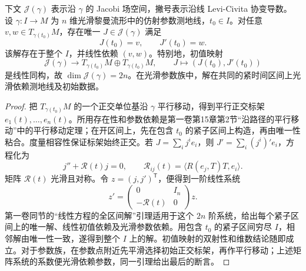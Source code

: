 \begin{theorem}\label{g3:thm:jacobi-initial-data}
	下文 \(\mathcal J(\gamma)\) 表示沿 \(\gamma\) 的 Jacobi 场空间，撇号表示沿线 Levi-Civita 协变导数。
	设 \(\gamma:I\to M\) 为 \(n\) 维光滑黎曼流形中的仿射参数测地线，\(t_0\in I\)。对任意 \(v,w\in T_{\gamma(t_0)}M\)，存在唯一 \(J\in\mathcal J(\gamma)\) 满足
	\[
		J(t_0)=v,\qquad J'(t_0)=w.
	\]
	该解存在于整个 \(I\)，并线性依赖 \((v,w)\)。特别地，初值映射
	\begin{equation}\label{g3:eq:jacobi-initial-isomorphism}
		\mathcal J(\gamma)\longrightarrow
		T_{\gamma(t_0)}M\oplus T_{\gamma(t_0)}M,
		\qquad J\longmapsto(J(t_0),J'(t_0))
	\end{equation}
	是线性同构，故 \(\dim\mathcal J(\gamma)=2n\)。在光滑参数族中，解在共同的紧时间区间上光滑依赖测地线及初始数据。
\end{theorem}
\begin{proof}
	把 \(T_{\gamma(t_0)}M\) 的一个正交单位基沿 \(\gamma\) 平行移动，得到平行正交标架 \(e_1(t),\ldots,e_n(t)\)。所用存在性和参数依赖是第一卷第15章第2节“沿路径的平行移动”中的平行移动定理；在开区间上，先在包含 \(t_0\) 的紧子区间上构造，再由唯一性粘合。度量相容性保证标架始终正交。若 \(J=\sum_i j^ie_i\)，则 \(J'=\sum_i(j^i)'e_i\)，方程化为
	\begin{equation}\label{g3:eq:jacobi-matrix-equation}
		j''+\mathcal R(t)j=0,
		\qquad \mathcal R_{ij}(t)=\langle R(e_j,T)T,e_i\rangle.
	\end{equation}
	矩阵 \(\mathcal R(t)\) 光滑且对称。令 \(z=(j,j')^{\mathsf T}\)，便得到一阶线性系统
	\[
		z'=\begin{pmatrix}0&I_n\\-\mathcal R(t)&0\end{pmatrix}z.
	\]
	第一卷同节的“线性方程的全区间解”引理适用于这个 \(2n\) 阶系统，给出每个紧子区间上的唯一解、线性初值依赖及光滑参数依赖。用包含 \(t_0\) 的紧子区间穷尽 \(I\)，相邻解由唯一性一致，遂得到整个 \(I\) 上的解。初值映射的双射性和维数结论随即成立。对于参数族，在参数点附近先平滑选择初始正交标架，再作平行移动；上述矩阵系统的系数便光滑依赖参数，同一引理给出最后的断言。
\end{proof}

